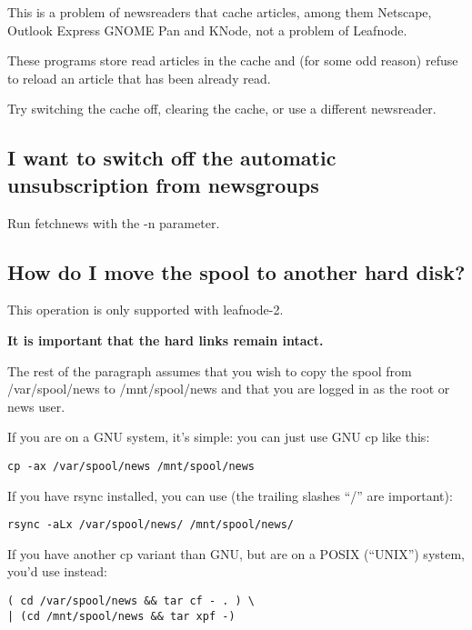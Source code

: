 \documentclass[10pt,english,a5paper]{article}
\begin{document}
   This is a problem of newsreaders that cache articles, among them
   Netscape, Outlook Express GNOME Pan and KNode, not a problem of Leafnode.

   These programs store read articles in the cache and (for some odd
   reason) refuse to reload an article that has been already read.

   Try switching the cache off, clearing the cache, or use a different
   newsreader.

\subsection{I want to switch off the automatic unsubscription from
newsgroups}

   Run fetchnews with the -n parameter.

\subsection{How do I move the spool to another hard disk?}

This operation is only supported with leafnode-2.

\textbf{It is important that the hard links remain intact.}

The rest of the paragraph assumes that you wish to copy the spool from
/var/spool/news to /mnt/spool/news and that you are logged in as the
root or news user.

If you are on a GNU system, it's simple: you can just use GNU cp like this:
\begin{verbatim}
cp -ax /var/spool/news /mnt/spool/news
\end{verbatim}

If you have rsync installed, you can use (the trailing slashes ``/'' are
important):
\begin{verbatim}
rsync -aLx /var/spool/news/ /mnt/spool/news/
\end{verbatim}

If you have another cp variant than GNU, but are on a POSIX (``UNIX'')
system, you'd use instead:
\begin{verbatim}
( cd /var/spool/news && tar cf - . ) \
| (cd /mnt/spool/news && tar xpf -)
\end{verbatim}
   
\end{document}
